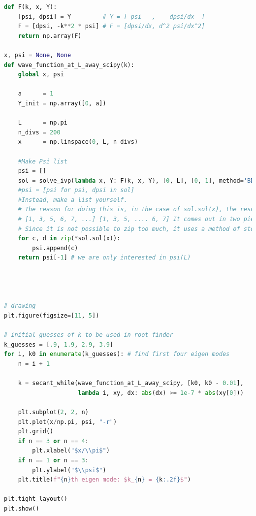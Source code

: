 \documentclass[11pt]{article}
\begin{document}
\begin{lstlisting}[language=Python]
def F(k, x, Y):
    [psi, dpsi] = Y         # Y = [ psi   ,    dpsi/dx  ]
    F = [dpsi, -k**2 * psi] # F = [dpsi/dx, d^2 psi/dx^2]
    return np.array(F)

x, psi = None, None
def wave_function_at_L_away_scipy(k):
    global x, psi
    
    a      = 1
    Y_init = np.array([0, a])
    
    L      = np.pi
    n_divs = 200 
    x      = np.linspace(0, L, n_divs)
    
    #Make Psi list
    psi = []
    sol = solve_ivp(lambda x, Y: F(k, x, Y), [0, L], [0, 1], method='BDF', dense_output = True)
    #psi = [psi for psi, dpsi in sol] 
    #Instead, make a list yourself.
    # The reason for doing this is, in the case of sol.sol(x), the result value is not [1, 2], [3, 4]
    # [1, 3, 5, 6, 7, ...] [1, 3, 5, .... 6, 7] It comes out in two pieces.
    # Since it is not possible to zip too much, it uses a method of storing each element in a single list.
    for c, d in zip(*sol.sol(x)):
        psi.append(c)
    return psi[-1] # we are only interested in psi(L)




# drawing
plt.figure(figsize=[11, 5])

# initial guesses of k to be used in root finder
k_guesses = [.9, 1.9, 2.9, 3.9]
for i, k0 in enumerate(k_guesses): # find first four eigen modes
    n = i + 1

    k = secant_while(wave_function_at_L_away_scipy, [k0, k0 - 0.01],
                     lambda i, xy, dx: abs(dx) >= 1e-7 * abs(xy[0]))

    plt.subplot(2, 2, n)
    plt.plot(x/np.pi, psi, "-r")
    plt.grid()
    if n == 3 or n == 4:
        plt.xlabel("$x/\\pi$")
    if n == 1 or n == 3:
        plt.ylabel("$\\psi$")
    plt.title(f"{n}th eigen mode: $k_{n} = {k:.2f}$")

plt.tight_layout()
plt.show()
\end{lstlisting}
\end{document}
